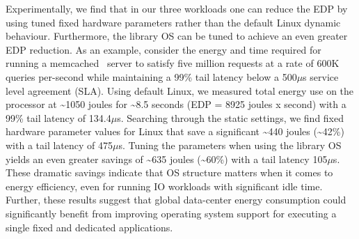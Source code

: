 

Experimentally, we find that in our three workloads one can reduce the EDP by using tuned fixed hardware parameters rather than the default Linux dynamic behaviour. Furthermore, the library OS can be tuned to achieve an even greater EDP reduction.
As an example, consider the energy and time required for running a memcached~\cite{memcached} server to satisfy five million requests at a rate of 600K queries per-second while maintaining a 99\% tail latency below a  500{$\mu$}s service level agreement (SLA).
Using default Linux, we measured total energy use on the processor at {\textasciitilde}1050 joules for {\textasciitilde}8.5 seconds (EDP = 8925 joules x second) with a 99\% tail latency of 134.4{$\mu$}s. Searching through the static settings, we find fixed hardware parameter values for Linux that save a significant {\textasciitilde}440 joules ({\textasciitilde}42\%) with a tail latency of 475{$\mu$}s.  Tuning the parameters when using the library OS yields an even greater savings of {\textasciitilde}635 joules ({\textasciitilde}60\%) with a tail latency 105{$\mu$}s. These dramatic savings indicate that OS structure matters when it comes to energy efficiency, even for running IO workloads with significant idle time. Further, these results suggest that global data-center energy consumption could significantly benefit from improving operating system support for executing a single fixed and dedicated applications. 


